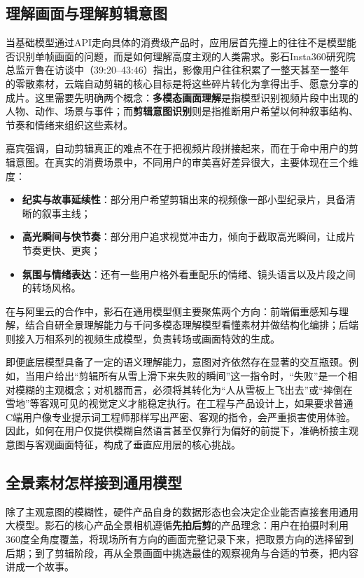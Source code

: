 \documentclass[UTF8,a4paper,11pt,fontset=fandol]{ctexart}
\begin{document}
\subsection{理解画面与理解剪辑意图}
当基础模型通过API走向具体的消费级产品时，应用层首先撞上的往往不是模型能否识别单帧画面的问题，而是如何理解高度主观的人类需求。影石Insta360研究院总监亓鲁在访谈中（39:20–43:46）指出，影像用户往往积累了一整天甚至一整年的零散素材，云端自动剪辑的核心目标是将这些碎片转化为拿得出手、愿意分享的成片。这里需要先明确两个概念：\textbf{多模态画面理解}是指模型识别视频片段中出现的人物、动作、场景与事件；而\textbf{剪辑意图识别}则是指推断用户希望以何种叙事结构、节奏和情绪来组织这些素材。

嘉宾强调，自动剪辑真正的难点不在于把视频片段拼接起来，而在于命中用户的剪辑意图。在真实的消费场景中，不同用户的审美喜好差异很大，主要体现在三个维度：
\begin{itemize}
\item \textbf{纪实与故事延续性}：部分用户希望剪辑出来的视频像一部小型纪录片，具备清晰的叙事主线；
\item \textbf{高光瞬间与快节奏}：部分用户追求视觉冲击力，倾向于截取高光瞬间，让成片节奏更快、更爽；
\item \textbf{氛围与情绪表达}：还有一些用户格外看重配乐的情绪、镜头语言以及片段之间的转场风格。
\end{itemize}
在与阿里云的合作中，影石在通用模型侧主要聚焦两个方向：前端偏重感知与理解，结合自研全景理解能力与千问多模态理解模型看懂素材并做结构化编排；后端则接入万相系列的视频生成模型，负责转场或画面特效的生成。

即便底层模型具备了一定的语义理解能力，意图对齐依然存在显著的交互瓶颈。例如，当用户给出“剪辑所有从雪上滑下来失败的瞬间”这一指令时，“失败”是一个相对模糊的主观概念；对机器而言，必须将其转化为“人从雪板上飞出去”或“摔倒在雪地”等客观可见的视觉定义才能稳定执行。在工程与产品设计上，如果要求普通C端用户像专业提示词工程师那样写出严密、客观的指令，会严重损害使用体验。因此，如何在用户仅提供模糊自然语言甚至仅靠行为偏好的前提下，准确桥接主观意图与客观画面特征，构成了垂直应用层的核心挑战。

\subsection{全景素材怎样接到通用模型}
除了主观意图的模糊性，硬件产品自身的数据形态也会决定企业能否直接套用通用大模型。影石的核心产品全景相机遵循\textbf{先拍后剪}的产品理念：用户在拍摄时利用360度全角度覆盖，将现场所有方向的画面完整记录下来，把取景方向的选择留到后期；到了剪辑阶段，再从全景画面中挑选最佳的观察视角与合适的节奏，把内容讲成一个故事。
\end{document}
